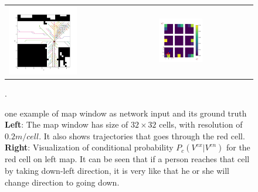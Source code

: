 \begin{figure}[hp]
\centering
\begin{tabular}{ll}
\includegraphics[width=0.48\textwidth]{figures/trajs_through_cell.png}
&
\includegraphics[width=0.48\textwidth]{figures/probs_on_that_cell_2.png}
\end{tabular}
\caption[one example of map window as network input and its ground truth]{one example of map window as network input and its ground truth \textbf{Left}: The map window has size of \( 32 \times 32 \) cells, with resolution of \( 0.2m/cell\). It also shows trajectories that goes through the red cell. \textbf{Right}: Visualization of conditional probability \( P_c(V^{ex} | V^{en}) \) for the red cell on left map. It can be seen that if a person reaches that cell by taking down-left direction, it is very like that he or she will change direction to going down.}. 
\label{fig:trajs}

\vspace*{\floatsep}


\end{figure}
